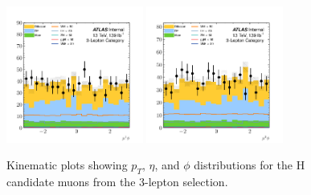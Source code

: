 \begin{figure}[htpb]
  \includegraphics[width=0.4\textwidth]{figures/hmm/kinematics/histo-3lep-u1_phi.pdf}
  \includegraphics[width=0.4\textwidth]{figures/hmm/kinematics/histo-3lep-u2_phi.pdf}
  \caption{Kinematic plots showing $p_T$, $\eta$, and $\phi$ distributions for the H candidate muons from the 3-lepton selection.}
    \label{fig:hmmKineWhMuons}
\end{figure}

